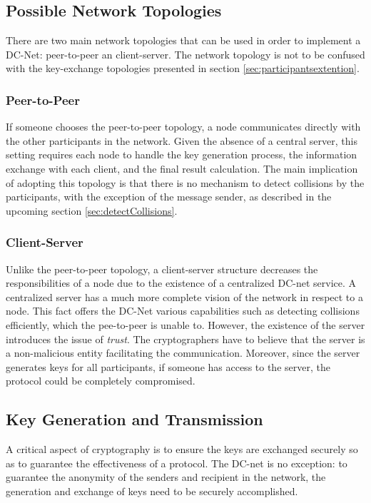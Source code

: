 \subsection{Possible Network Topologies} \label{sec:networkTopologies}
There are two main network topologies that can be used in order to implement a DC-Net: peer-to-peer an client-server. The network topology is not to be confused with the key-exchange topologies presented in section \ref{sec:participantsextention}.


\subsubsection{Peer-to-Peer} \label{sec:peertopeer}
If someone chooses the peer-to-peer topology, a node communicates directly with the other participants in the network. Given the absence of a central server, this setting requires each node to handle the key generation process, the information exchange with each client, and the final result calculation.
The main implication of adopting this topology is that there is no mechanism to detect collisions by the participants, with the exception of the message sender, as described in the upcoming section \ref{sec:detectCollisions}. 


\subsubsection{Client-Server} \label{sec:clientserver}
Unlike the peer-to-peer topology, a client-server structure decreases the responsibilities of a node due to the existence of a centralized DC-net service. A centralized server has a much more complete vision of the network in respect to a node. This fact offers the DC-Net various capabilities such as detecting collisions efficiently, which the pee-to-peer is unable to. However, the existence of the server introduces the issue of \emph{trust}. The cryptographers have to believe that the server is a non-malicious entity facilitating the communication. Moreover, since the server generates keys for all participants, if someone has access to the server, the protocol could be completely compromised.


\subsection{Key Generation and Transmission} \label{sec:keyExchangeMethods}
A critical aspect of cryptography is to ensure the keys are exchanged securely so as to guarantee the effectiveness of a protocol. The DC-net is no exception: to guarantee the anonymity of the senders and recipient in the network, the generation and exchange of keys need to be securely accomplished.

